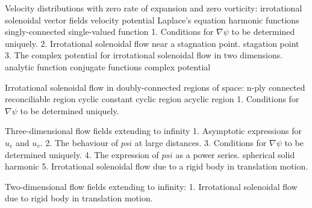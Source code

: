 \begin{multicols}{3}
  Velocity distributions with zero rate of expansion and zero vorticity:
  irrotational solenoidal vector fields
  velocity potential
  Laplace's equation
  harmonic functions
  singly-connected
  single-valued function
  1. Conditions for $\nabla \psi$ to be determined uniquely.
  2. Irrotational solenoidal flow near a stagnation point.
  stagation point
  3. The complex potential for irrotational solenoidal flow in two dimensions.
  analytic function
  conjugate functions
  complex potential
  
  Irrotational solenoidal flow in doubly-connected regions of space:
  n-ply connected
  reconciliable region
  cyclic constant
  cyclic region
  acyclic region
  1. Conditions for $\nabla \psi$ to be determined uniquely.

  Three-dimensional flow fields extending to infinity
  1. Asymptotic expressions for $u_e$ and $u_v$.
  2. The behaviour of $psi$ at large distances.
  3. Conditions for $\nabla \psi$ to be determined uniquely.
  4. The expression of $psi$ as a power series.
  spherical solid harmonic
  5. Irrotational solenoidal flow due to a rigid body in translation motion.
  
  Two-dimensional flow fields extending to infinity:
  1. Irrotational solenoidal flow due to rigid body in translation motion.


\end{multicols}


